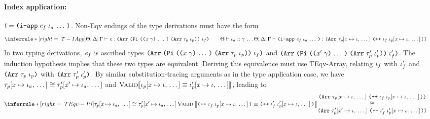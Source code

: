 \begin{sproof}
  \paragraph{Index application:}
  $\term = \iapp{\expr_f}{\sequence{\idx_a}}$.
  Non-{\sc Eqv} endings of the type derivations must have the form
  \[\infr[T-IApp]
  {\typeof
    {\sEnv}{\kEnv}{\tEnv}
    {\expr}
    {\typearray{\typedprod{\sequence{\notevar{\var}{\sort}}}{\typearray{\type_p}{\idx_p}}}{\idx_f}}
    \qquad
    \sequence{\sortof{\sEnv}{\idx_a}{\sort}}}
  {\typeof
    {\sEnv}{\kEnv}{\tEnv}
    {\iapp{\expr_f}{\sequence{\idx_a}}}
    {\typearray{\seqsubst{\type_p}{\var}{\idx}}{\idxappend{\idx_f\;\seqsubst{\idx_p}{\var}{\idx}}}}}\]
  In two typing derivations,
  $\mathit{e}_f$ is ascribed types
  $\typearray{\typedprod{\sequence{\notevar{\var}{\sort}}}{\typearray{\type_p}{\idx_p}}}{\idx_f}$
  and $\typearray{\typedprod{\sequence{\notevar{\var'}{\sort}}}{\typearray{\type_p'}{\idx_p'}}}{\idx_f'}$.
  The induction hypothesis implies that these two types are equivalent.
  Deriving this equivalence must use {\sc TEqv-Array},
  relating $\mathit{\iota}_f$ with $\mathit{\iota}_f'$
  and $\typearray{\type_p}{\idx_p}$ with $\typearray{\type_p'}{\idx_p'}$.
  By similar substitution-tracing arguments as in the type application case,
  we have $\mathit{\tau}_p\hspace{-2pt}\left[ \mathit{x} \mapsto \mathit{\iota}_a, \, \ldots \, \right] \cong \mathit{\tau}_p'\hspace{-2pt}\left[ \mathit{x}' \mapsto \mathit{\iota}_a, \, \ldots \, \right]$
  and
  $\text{\sc Valid} \llbracket {\mathit{\iota}_p\hspace{-2pt}\left[ \mathit{x}\mapsto \mathit{\iota}, \, \ldots \, \right]}
  \equiv {\mathit{\iota}_p'\hspace{-2pt}\left[ \mathit{x}\mapsto \mathit{\iota}, \, \ldots \, \right]} \rrbracket$,
  leading to
  \[\infr[TEqv-Pi]
  {\teqv
    {\seqsubst{\type_p}{\var}{\idx_a}}
    {\seqsubst{\type_p'}{\var'}{\idx_a}}
    \\\\
    \ieqv
    {\idxappend{\idx_f\;\seqsubst{\idx_p}{\var}{\idx}}}
    {\idxappend{\idx_f'\;\seqsubst{\idx_p'}{\var}{\idx}}}}
  {\parbox{0.55\textwidth}
    {\centering
      \({\typearray
        {\seqsubst{\type_p}{\var}{\idx}}
        {\idxappend{\idx_f\;\seqsubst{\idx_p}{\var}{\idx}}}}\)\\
      \(\teqv{}{}
      {\typearray
        {\seqsubst{\type_p'}{\var'}{\idx}}
        {\idxappend{\idx_f'\;\seqsubst{\idx_p'}{\var}{\idx}}}}\)}}\]

\end{sproof}
